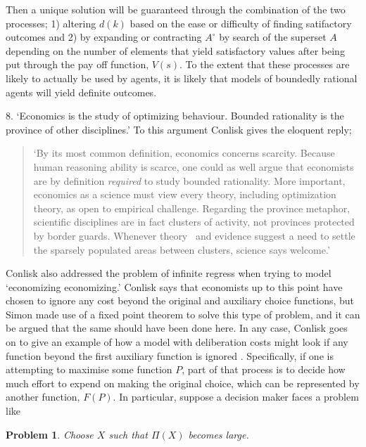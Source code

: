 \documentclass{ucthesis}
\newtheorem{problem}[theorem]{Problem}
\begin{document}
Then a unique solution will be guaranteed through the combination of the two
processes; 1) altering $d\left( k\right) $ based on the ease or difficulty
of finding satifactory outcomes and 2) by expanding or contracting $A^{\circ
}$ by search of the superset $A$ depending on the number of elements that
yield satisfactory values after being put through the pay off function, $%
V\left( s\right) $. To the extent that these processes are likely to
actually be used by agents, it is likely that models of boundedly rational
agents will yield definite outcomes.

8. `Economics is the study of optimizing behaviour. Bounded rationality is
the province of other disciplines.' To this argument Conlisk gives the
eloquent reply;

\begin{quotation}
`By its most common definition, economics concerns scarcity. Because human
reasoning ability is scarce, one could as well argue that economists are by
definition \textit{required} to study bounded rationality. More important,
economics as a science must view every theory, including optimization
theory, as open to empirical challenge. Regarding the province metaphor,
scientific disciplines are in fact clusters of activity, not provinces
protected by border guards. Whenever theory \ and evidence suggest a need to
settle the sparsely populated areas between clusters, science says welcome.'%
\cite[pp. 686, italics in the original]{conlisk}
\end{quotation}

Conlisk also addressed the problem of infinite regress when trying to model
`economizing economizing.' Conlisk says that economists up to this point
have chosen to ignore any cost beyond the original and auxiliary choice
functions, but Simon made use of a fixed point theorem to solve this type of
problem, and it can be argued that the same should have been done here. In
any case, Conlisk goes on to give an example of how a model with
deliberation costs might look if any function beyond the first auxiliary
function is ignored \cite[pp. 688]{conlisk}. Specifically, if one is
attempting to maximise some function $P$, part of that process is to decide
how much effort to expend on making the original choice, which can be
represented by another function, $F\left( P\right) $. In particular, suppose
a decision maker faces a problem like

\begin{problem}
Choose $X$ such that $\Pi \left( X\right) $ becomes large.
\end{problem}
\end{document}
